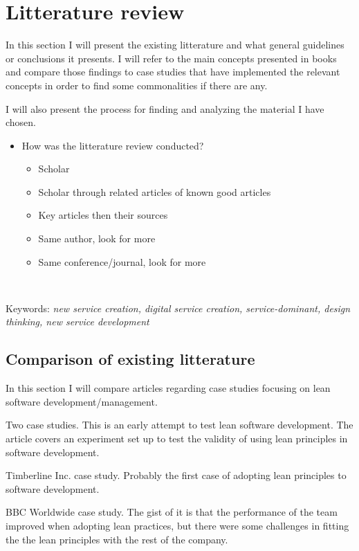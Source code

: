 
\chapter{Litterature review}
\label{chapter:litterature}

In this section I will present the existing litterature and what general guidelines or conclusions it presents. I will refer to the main concepts presented in books and compare those findings to case studies that have implemented the relevant concepts in order to find some commonalities if there are any.

I will also present the process for finding and analyzing the material I have chosen.

\begin{itemize}
  \item{How was the litterature review conducted?}
  \begin{itemize}
    \item{Scholar}
    \item{Scholar through related articles of known good articles}
    \item{Key articles then their sources}
    \item{Same author, look for more}
    \item{Same conference/journal, look for more}
  \end{itemize}
  \
\end{itemize}

Keywords: \textit{new service creation, digital service creation, service-dominant, design thinking, new service development}

\section{Comparison of existing litterature}

In this section I will compare articles regarding case studies focusing on lean software development/management.

Two case studies. This is an early attempt to test lean software development. The article covers an experiment set up to test the validity of using lean principles in software development. \cite{Middleton2001Lean}

Timberline Inc. case study. Probably the first case of adopting lean principles to software development.\cite{Middleton2005Lean}

BBC Worldwide case study. The gist of it is that the performance of the team improved when adopting lean practices, but there were some challenges in fitting the the lean principles with the rest of the company.\cite{Middleton2012Lean}


